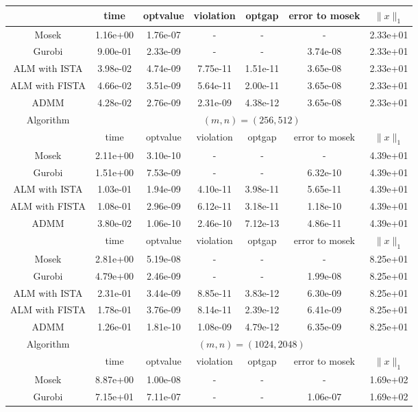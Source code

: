 \documentclass{article}
\begin{document}
\begin{table}[H]
\begin{tabular}{|c|c|c|c|c|c|c|}
 &  time & optvalue & violation & optgap & error to mosek& $\|x\|_1 $\\\hline
 Mosek & 1.16e+00 & 1.76e-07 &- & - & - & 2.33e+01\\\hline
 Gurobi & 9.00e-01 & 2.33e-09 & - & - & 3.74e-08 & 2.33e+01\\\hline
 ALM with ISTA & 3.98e-02 & 4.74e-09 & 7.75e-11 & 1.51e-11 &3.65e-08 & 2.33e+01 \\\hline
 ALM with FISTA & 4.66e-02 & 3.51e-09 & 5.64e-11 & 2.00e-11 &3.65e-08 & 2.33e+01 \\\hline
 ADMM & 4.28e-02 & 2.76e-09 & 2.31e-09 & 4.38e-12&3.65e-08 & 2.33e+01  \\\hline
 \multirow{2}{*}{Algorithm }& \multicolumn{6}{c|}{$(m,n)=(256,512)$} \\\cline{2-7}
 &  time & optvalue & violation & optgap & error to mosek& $\|x\|_1 $\\\hline
 Mosek & 2.11e+00 & 3.10e-10 &- & - & - & 4.39e+01\\\hline
 Gurobi & 1.51e+00 & 7.53e-09 & - & - & 6.32e-10 & 4.39e+01\\\hline
 ALM with ISTA & 1.03e-01 & 1.94e-09 & 4.10e-11 & 3.98e-11 &5.65e-11 & 4.39e+01 \\\hline
 ALM with FISTA & 1.08e-01 & 2.96e-09 & 6.12e-11 & 3.18e-11 &1.18e-10 & 4.39e+01 \\\hline
 ADMM & 3.80e-02 & 1.06e-10 & 2.46e-10 & 7.12e-13&4.86e-11 & 4.39e+01  \\\hline
 &  time & optvalue & violation & optgap & error to mosek& $\|x\|_1 $\\\hline
 Mosek & 2.81e+00 & 5.19e-08 &- & - & - & 8.25e+01\\\hline
 Gurobi & 4.79e+00 & 2.46e-09 & - & - & 1.99e-08 & 8.25e+01\\\hline
 ALM with ISTA & 2.31e-01 & 3.44e-09 & 8.85e-11 & 3.83e-12 &6.30e-09 & 8.25e+01 \\\hline
 ALM with FISTA & 1.78e-01 & 3.76e-09 & 8.14e-11 & 2.39e-12 &6.41e-09 & 8.25e+01 \\\hline
 ADMM & 1.26e-01 & 1.81e-10 & 1.08e-09 & 4.79e-12&6.35e-09 & 8.25e+01  \\\hline
 \multirow{2}{*}{Algorithm }& \multicolumn{6}{c|}{$(m,n)=(1024,2048)$} \\\cline{2-7}
 &  time & optvalue & violation & optgap & error to mosek& $\|x\|_1 $\\\hline
 Mosek & 8.87e+00 & 1.00e-08 &- & - & - & 1.69e+02\\\hline
 Gurobi & 7.15e+01 & 7.11e-07 & - & - & 1.06e-07 & 1.69e+02\\\hline

\end{tabular}
\end{table}
\end{document}
